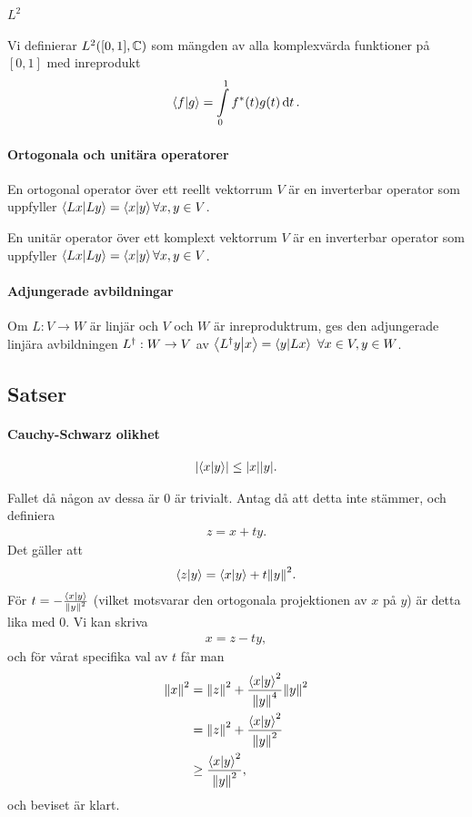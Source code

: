 \paragraph{$L^{2}$}
Vi definierar $L^{2}([0, 1], \mathbb{C})$ som mängden av alla komplexvärda funktioner på $[0, 1]$ med inreprodukt
\begin{align*}
	\bra{f}\ket{g} = \int\limits_{0}^{1}f^{*}(t)g(t)\dd{t}.
\end{align*}

\paragraph{Ortogonala och unitära operatorer}
En ortogonal operator över ett reellt vektorrum $V$ är en inverterbar operator som uppfyller $\bra{Lx}\ket{Ly} = \bra{x}\ket{y}\forall x, y\in V$.

En unitär operator över ett komplext vektorrum $V$ är en inverterbar operator som uppfyller $\bra{Lx}\ket{Ly} = \bra{x}\ket{y}\forall x, y\in V$.

\paragraph{Adjungerade avbildningar}
Om $L: V\to W$ är linjär och $V$ och $W$ är inreproduktrum, ges den adjungerade linjära avbildningen $L^{\dagger}: W\to V$ av $\bra{L^{\dagger}y}\ket{x} = \bra{y}\ket{Lx}\ \forall x\in V, y\in W$.

\subsection{Satser}

\paragraph{Cauchy-Schwarz olikhet}

\begin{align*}
	\abs{\bra{x}\ket{y}} \leq \abs{x}\abs{y}.
\end{align*}

\proof
Fallet då någon av dessa är $0$ är trivialt. Antag då att detta inte stämmer, och definiera
\begin{align*}
	z = x + ty.
\end{align*}
Det gäller att
\begin{align*}
	\bra{z}\ket{y} = \bra{x}\ket{y} + t\norm{y}^{2}.
\end{align*}
För $t = -\frac{\bra{x}\ket{y}}{\norm{y}^{2}}$ (vilket motsvarar den ortogonala projektionen av $x$ på $y$) är detta lika med $0$. Vi kan skriva
\begin{align*}
	x = z - ty,
\end{align*}
och för vårat specifika val av $t$ får man
\begin{align*}
	\norm{x}^{2} &= \norm{z}^{2} + \frac{\bra{x}\ket{y}^{2}}{\norm{y}^{4}}\norm{y}^{2} \\
	             &= \norm{z}^{2} + \frac{\bra{x}\ket{y}^{2}}{\norm{y}^{2}} \\
	             &\geq \frac{\bra{x}\ket{y}^{2}}{\norm{y}^{2}},
\end{align*}
och beviset är klart.


